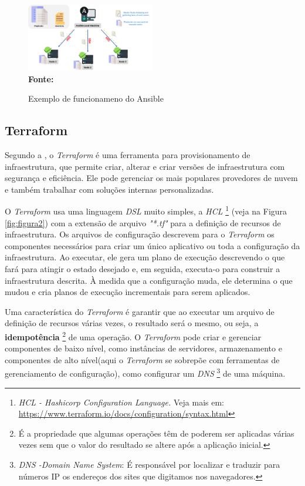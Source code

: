  \begin{figure}[ht]
	\centering	
	\caption[\hspace{0.1cm}Exemplo de funcionameno do Ansible]{Exemplo de funcionameno do Ansible}
	\vspace{-0.4cm}
	\includegraphics[width=0.5\textwidth]{figuras/ansible-working.png}
	 \vspace{-0.2cm}
	\\\textbf{\footnotesize Fonte: \cite{intellipaat}}
	\label{fig:figura6}
\end{figure}
\vspace{-0.5cm}

\subsection{Terraform} \label{terraform} 

 Segundo a , o \textit{Terraform} é uma ferramenta para provisionamento de infraestrutura, que permite criar, alterar e criar versões de infraestrutura com segurança e eficiência. Ele pode gerenciar os mais populares provedores de nuvem e também trabalhar com soluções internas personalizadas.

O \textit{Terraform} usa uma linguagem \textit{DSL} muito simples, a \textit{HCL} \footnote{\textit{HCL - Hashicorp Configuration Language.} Veja mais em: \href{https://www.terraform.io/docs/configuration/syntax.html}{https://www.terraform.io/docs/configuration/syntax.html} } (veja na Figura \ref{fig:figura2}) com a extensão de arquivo \textit{"*.tf"} para a definição de recursos de infraestrutura. Os arquivos de configuração descrevem para o \textit{Terraform} os componentes necessários para criar um único aplicativo ou toda a configuração da infraestrutura. Ao executar, ele gera um plano de execução descrevendo o que fará para atingir o estado desejado e, em seguida, executa-o para construir a infraestrutura descrita. 
À medida que a configuração muda, ele determina o que mudou e cria planos de execução incrementais para serem aplicados.

Uma característica do \textit{Terraform} é garantir que ao executar um arquivo de definição de recursos várias vezes, o resultado será o mesmo, ou seja, a \textbf{idempotência} \footnote{É a propriedade que algumas operações têm de poderem ser aplicadas várias vezes sem que o valor do resultado se altere após a aplicação inicial.} de uma operação. O \textit{Terraform} pode criar e gerenciar componentes de baixo nível, como instâncias de servidores, armazenamento e componentes de alto nível(aqui o \textit{Terraform} se sobrepõe com ferramentas de gerenciamento de configuração), como configurar um \textit{DNS} \footnote{\textit{DNS -Domain Name System}: É responsável por localizar e traduzir para números IP os endereços dos sites que digitamos nos navegadores.} de uma máquina. \cite{brikman2017terraform}

